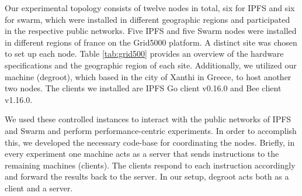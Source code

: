 \begin{table}[H]
\centering
\begin{small}
\caption{Grid5000's sites and clusters we utilized to conduct our experiments.}
\label{tab:grid500}
\end{small}
\end{table}



Our experimental topology consists of twelve nodes in total, six for IPFS and six for swarm, which were installed in different geographic regions and participated in the respective public networks. Five IPFS and five Swarm nodes were installed in different regions of france on the Grid5000 platform. A distinct site was chosen to set up each node. Table \ref{tab:grid500} provides an overview of the hardware specifications and the geographic region of each site. Additionally, we utilized our machine (degroot), which based in the city of Xanthi in Greece, to host another two nodes. The clients we installed are IPFS Go client v0.16.0 and Bee client v1.16.0.

We used these controlled instances to interact with the public networks of IPFS and Swarm and perform performance-centric experiments. In order to accomplish this, we developed the necessary code-base for coordinating the nodes. Briefly, in every experiment one machine acts as a server that sends instructions to the remaining machines (clients). The clients respond to each instruction accordingly and forward the results back to the server. In our setup, degroot acts both as a client and a server. 

